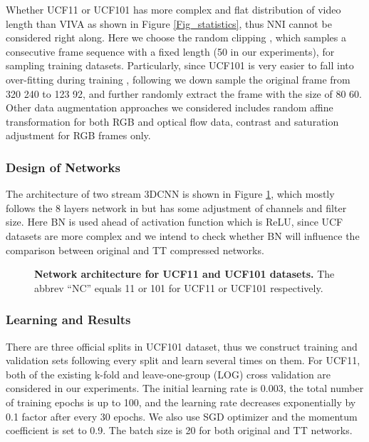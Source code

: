 \documentclass[a4paper,fleqn]{cas-dc}
\begin{document}
Whether UCF11 or UCF101 has more complex and flat distribution of video length than VIVA as shown in Figure \ref{Fig_statistics}, thus NNI cannot be considered right along. Here we choose the random clipping \citep{Varol_2018_LongTerm3DCNN,Simonyan_2014_TwoStream}, which samples a consecutive frame sequence with a fixed length (50 in our experiments), for sampling training datasets. Particularly, since UCF101 is very easier to fall into over-fitting during training \citep{Hara_2018_Res3DCNN}, following \citet{Varol_2018_LongTerm3DCNN} we down sample the original frame from 320  240 to 123  92, and further randomly extract the frame with the size of 80  60. Other data augmentation approaches we considered includes random affine transformation for both RGB and optical flow data, contrast and saturation adjustment for RGB frames only.

\subsubsection{Design of Networks}\quad

The architecture of two stream 3DCNN is shown in Figure \ref{Fig_UCF_3DCNNs}, which mostly follows the 8 layers network in \citet{Varol_2018_LongTerm3DCNN} but has some adjustment of channels and filter size. Here BN is used ahead of activation function which is ReLU, since UCF datasets are more complex and we intend to check whether BN will influence the comparison between original and TT compressed networks.

\begin{figure}
\centering
{}
\caption{\textbf{Network architecture for UCF11 and UCF101 datasets.} The abbrev ``NC'' equals 11 or 101 for UCF11 or UCF101 respectively.}
\label{Fig_UCF_3DCNNs}
\end{figure}

\subsubsection{Learning and Results}\quad

There are three official splits in UCF101 dataset, thus we construct training and validation sets following every split and learn several times on them. For UCF11, both of the existing k-fold \citep{Yang_2017_TTRNN} and leave-one-group (LOG) \citep{Peng_2014_UCF11} cross validation are considered in our experiments. The initial learning rate is 0.003, the total number of training epochs is up to 100, and the learning rate decreases exponentially by 0.1 factor after every 30 epochs. We also use SGD optimizer and the momentum coefficient is set to 0.9. The batch size is 20 for both original and TT networks.
\end{document}
